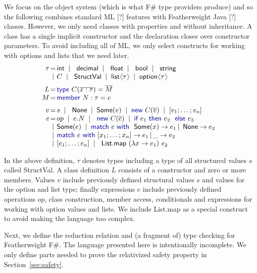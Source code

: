 \documentclass[preprint]{sigplanconf}
\newcommand{\langl}{\begin{picture}(4.5,7)
\put(1.1,2.5){\rotatebox{60}{\line(1,0){5.5}}}
\put(1.1,2.5){\rotatebox{300}{\line(1,0){5.5}}}
\end{picture}}
\newcommand{\rangl}{\begin{picture}(4.5,7)
\put(.9,2.5){\rotatebox{120}{\line(1,0){5.5}}}
\put(.9,2.5){\rotatebox{240}{\line(1,0){5.5}}}
\end{picture}}
\newcommand{\kvd}[1]{\textnormal{\textcolor{kvdclr}{\sffamily #1}}}
\newcommand{\ident}[1]{\textnormal{\sffamily #1}}
\newcommand{\lsep}[0]{\;\; | \;\;}
\newcommand{\narrow}[1]{\hspace{-0.85em} #1 \hspace{-0.85em}}
\begin{document}
We focus on the object system (which is what F\# type providers produce) and so the following combines 
standard ML [?] features with Featherweight Java [?] classes. However, we only need classes with properties and
without inheritance. A class has a single implicit constructor and the declaration closes over 
constructor parameters. To avoid including all of ML, we only select constructs for working with options and lists
that we need later.
%
\begin{equation*}
\begin{array}{rcl}
 \tau &\narrow{=}& \ident{int} \lsep \ident{decimal} \lsep \ident{float} \lsep \ident{bool} \lsep \ident{string} \\[0.0em]
      &\narrow{|}& C \lsep \ident{StructVal} \lsep \ident{list}\langl\tau\rangl \lsep \ident{option}\langl\tau\rangl \\[0.6em]
 L &\narrow{=}& \kvd{type}~C(\overline{x:\tau}) = \overline{M} \\[0.0em]
 M &\narrow{=}& \kvd{member}~N:\tau=e \\[0.6em]
 v &\narrow{=}& s \lsep \ident{None} \lsep \ident{Some}(v) \lsep \kvd{new}~C(\overline{v}) \lsep [v_1; \ldots; v_n] \\[0.0em]
 e &\narrow{=}& op \lsep e.N \lsep \kvd{new}~C(\overline{e}) \lsep {\kvd{if}~e_1~\kvd{then}~e_2~\kvd{else}~e_3}\\
   &\narrow{|}& \ident{Some}(e)\lsep\kvd{match}~e~\kvd{with}~\ident{Some}(x) \rightarrow e_1 \,|\, \ident{None} \rightarrow e_2 \\
   &\narrow{|}& \kvd{match}~e~\kvd{with}~[x_1; \ldots; x_n] \rightarrow e_1 \,|\, \_ \rightarrow e_2 \\
   &\narrow{|}& [e_1;\ldots;e_n]\lsep \ident{List.map}~(\lambda x\rightarrow e_1)~e_2
\end{array}
\end{equation*}

\noindent
In the above definition, $\tau$ denotes types including a type of all structured values $s$ called
\ident{StructVal}. A class definition $L$ consists of a constructor and zero or more members. Values $v$ include 
previously defined structural values $s$ and values for the option and list type; finally expressions $e$ include 
previously defined operations $op$, class construction, member access, conditionals and expressions for working 
with option values and lists. We include \ident{List.map} as a special construct to avoid making the language too complex.

Next, we define the reduction relation and (a fragment of) type checking for Featherweight F\#.
The language presented here is intentionally incomplete. We only define parts needed to prove
the relativized safety property in Section~\ref{sec:safety}.
\end{document}
